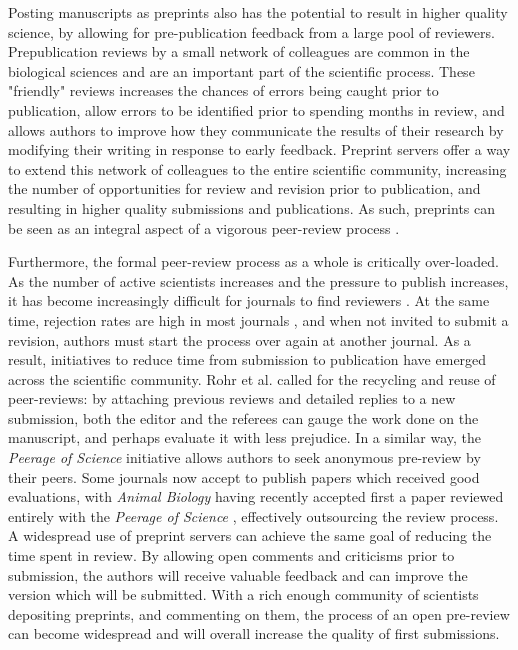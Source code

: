 \documentclass[letterpaper,twocolumn,superscriptaddress,showkeys,longbibliography]{revtex4-1}
\begin{document}
Posting manuscripts as preprints also has the potential to result in higher
quality science, by allowing for pre-publication feedback from a large pool of
reviewers. Prepublication reviews by a small network of colleagues are common in
the biological sciences and are an important part of the scientific process.
These "friendly" reviews increases the chances of errors being caught prior to
publication, allow errors to be identified prior to spending months in review,
and allows authors to improve how they communicate the results of their research
by modifying their writing in response to early feedback. Preprint servers offer
a way to extend this network of colleagues to the entire scientific community,
increasing the number of opportunities for review and revision prior to
publication, and resulting in higher quality submissions and publications.  As
such, preprints can be seen as an integral aspect of a vigorous peer-review
process \cite{hoc12}. 

Furthermore, the formal peer-review process as a whole is critically
over-loaded. As the number of active scientists increases and the pressure to
publish increases, it has become increasingly difficult for journals to find
reviewers \cite{hoc09}.  At the same time, rejection rates are high in most
journals \cite{aar08,roh09}, and when not invited to submit a revision, authors
must start the process over again at another journal. As a result, initiatives
to reduce time from submission to publication have emerged across the scientific
community. Rohr et al.  \cite{roh09} called for the recycling and reuse of
peer-reviews: by attaching previous reviews and detailed replies to a new
submission, both the editor and the referees can gauge the work done on the
manuscript, and perhaps evaluate it with less prejudice. In a similar way, the
\emph{Peerage of Science} initiative allows authors to seek anonymous pre-review
by their peers. Some journals now accept to publish papers which received good
evaluations, with \emph{Animal Biology} having recently accepted first a paper
reviewed entirely with the \emph{Peerage of Science} \cite{abb12}, effectively
outsourcing the review process. A widespread use of preprint servers can achieve
the same goal of reducing the time spent in review. By allowing open comments
and criticisms prior to submission, the authors will receive valuable feedback
and can improve the version which will be submitted. With a rich enough
community of scientists depositing preprints, and commenting on them, the
process of an open pre-review can become widespread and will overall increase
the quality of first submissions.
\end{document}
